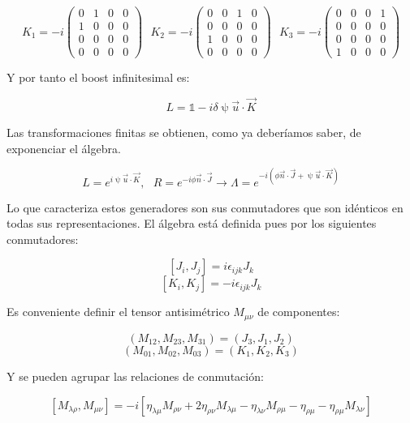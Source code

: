 \documentclass{article}
\begin{document}
    $$K_1= -i\left (\begin{array}{cccc}
    0 & 1 &  0 &  0\\
    1 & 0 &  0 & 0 \\
     0 & 0 & 0 & 0\\
       0 & 0 & 0 & 0
\end{array} \right ) \ \ \ K_2= -i\left (\begin{array}{cccc}
    0 & 0 &  1 &  0\\
    0 & 0 &  0 & 0 \\
     1 & 0 & 0 & 0\\
       0 & 0 & 0 & 0
\end{array} \right ) \ \ \ K_3= -i\left (\begin{array}{cccc}
    0 & 0 &  0 &  1\\
    0 & 0 &  0 & 0 \\
     0 & 0 & 0 & 0\\
       1 & 0 & 0 & 0
\end{array} \right )$$


        Y por tanto el boost infinitesimal es:

        $$L=\mathds{1}-i\delta \uppsi \Vec{u} \cdot \Vec{K}$$

        \newpage

        Las transformaciones finitas se obtienen, como ya deberíamos saber, de exponenciar el álgebra.

        $$L=e^{i\uppsi \Vec{u} \cdot \Vec{K}}, \ \ \ R=e^{-i \phi \Vec{n} \cdot \Vec{J}} \longrightarrow \Lambda =e^{-i(\phi \Vec{n}\cdot \Vec{J} + \uppsi \Vec{u}\cdot \Vec{K})}$$

        Lo que caracteriza estos generadores son sus conmutadores que son idénticos en todas sus representaciones. El álgebra está definida pues por los siguientes conmutadores:


        $$[J_i,J_j]=i\epsilon _{ijk}J_k$$
        $$[K_i,K_j]=-i\epsilon_{ijk}J_k$$

        Es conveniente definir el tensor antisimétrico $M_{\mu \nu}$ de componentes:

        $$(M_{12},M_{23},M_{31})=(J_3,J_1,J_2)$$
        $$(M_{01},M_{02},M_{03})=(K_1,K_2,K_3)$$

        Y se pueden agrupar las relaciones de conmutación:

        $$[M_{\lambda \rho},M_{\mu \nu}]=-i[\eta_{\lambda \mu}M_{\rho \nu} + 2\eta _{\rho \nu} M_{\lambda \mu}-\eta _{\lambda \nu}M_{\rho \mu} - \eta_{\rho \mu}-\eta _{\rho \mu}M_{\lambda \nu} ]$$
\end{document}

